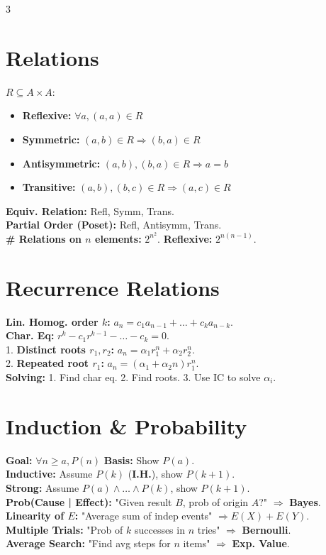 \documentclass[10pt]{article}
\begin{document}
\begin{multicols}{3}
\section{Relations}
$R \subseteq A \times A$:
\begin{itemize}
    \item \textbf{Reflexive:} $\forall a, (a,a) \in R$
    \item \textbf{Symmetric:} $(a,b) \in R \Rightarrow (b,a) \in R$
    \item \textbf{Antisymmetric:} $(a,b),(b,a) \in R \Rightarrow a=b$
    \item \textbf{Transitive:} $(a,b),(b,c) \in R \Rightarrow (a,c) \in R$
\end{itemize}
\textbf{Equiv. Relation:} Refl, Symm, Trans. \\
\textbf{Partial Order (Poset):} Refl, Antisymm, Trans. \\
\textbf{\# Relations on $n$ elements:} $2^{n^2}$. \textbf{Reflexive:} $2^{n(n-1)}$.

\section{Recurrence Relations}
\textbf{Lin. Homog. order $k$:} $a_n = c_1 a_{n-1} + \dots + c_k a_{n-k}$. \\
\textbf{Char. Eq:} $r^k - c_1 r^{k-1} - \dots - c_k = 0$. \\
1. \textbf{Distinct roots $r_1, r_2$:} $a_n = \alpha_1 r_1^n + \alpha_2 r_2^n$. \\
2. \textbf{Repeated root $r_1$:} $a_n = (\alpha_1 + \alpha_2 n) r_1^n$. \\
\textbf{Solving:} 1. Find char eq. 2. Find roots. 3. Use IC to solve $\alpha_i$.

\section{Induction \& Probability}
\textbf{Goal:} $\forall n \ge a, P(n)$ \quad \textbf{Basis:} Show $P(a)$. \\
\textbf{Inductive:} Assume $P(k)$ (\textbf{I.H.}), show $P(k+1)$. \\
\textbf{Strong:} Assume $P(a) \land \dots \land P(k)$, show $P(k+1)$. \\
\textbf{Prob(Cause | Effect):} "Given result $B$, prob of origin $A$?" $\Rightarrow$ \textbf{Bayes}. \\
\textbf{Linearity of $E$:} "Average sum of indep events" $\Rightarrow E(X)+E(Y)$. \\
\textbf{Multiple Trials:} "Prob of $k$ successes in $n$ tries" $\Rightarrow$ \textbf{Bernoulli}. \\
\textbf{Average Search:} "Find avg steps for $n$ items" $\Rightarrow$ \textbf{Exp. Value}.


\end{multicols}
\end{document}
